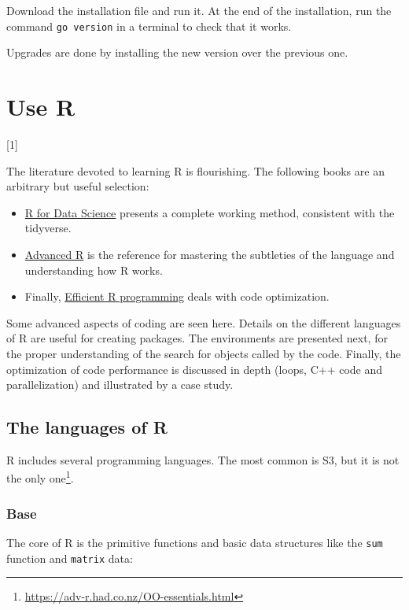 \documentclass[
  12pt,
  american,
  a4paper,
  extrafontsizes,onecolumn,openright
  ]{memoir}
\providecommand{\tightlist}{%
  \setlength{\itemsep}{0pt}\setlength{\parskip}{0pt}}
\newlength{\rf}
\newcommand{\toc}[1]{%
  \startcontents[chapters]%
  \printcontents[chapters]{}{1}[#1]{}%
  ~\newline%
}
\begin{document}
Download the installation file and run it.
At the end of the installation, run the command \texttt{go\ version} in a terminal to check that it works.

Upgrades are done by installing the new version over the previous one.

\chapter{Use R}\label{chap-utiliseR}

\toc{1}

The literature devoted to learning R is flourishing.
The following books are an arbitrary but useful selection:

\begin{itemize}
\tightlist
\item
  \href{https://r4ds.had.co.nz/}{R for Data Science} \autocite{Wickham2016} presents a complete working method, consistent with the tidyverse.
\item
  \href{http://adv-r.had.co.nz/}{Advanced R} \autocite{Wickham2014} is the reference for mastering the subtleties of the language and understanding how R works.
\item
  Finally, \href{https://csgillespie.github.io/efficientR/}{Efficient R programming} \autocite{Gillespie2016} deals with code optimization.
\end{itemize}

Some advanced aspects of coding are seen here.
Details on the different languages of R are useful for creating packages.
The environments are presented next, for the proper understanding of the search for objects called by the code.
Finally, the optimization of code performance is discussed in depth (loops, C++ code and parallelization) and illustrated by a case study.

\section{The languages of R}\label{the-languages-of-r}

R includes several programming languages.
The most common is S3, but it is not the only one\footnote{\url{https://adv-r.had.co.nz/OO-essentials.html}}.

\subsection{Base}\label{base}

The core of R is the primitive functions and basic data structures like the \texttt{sum} function and \texttt{matrix} data:
\end{document}
